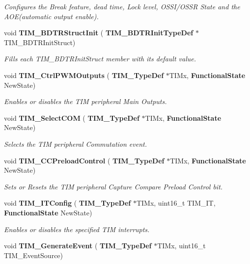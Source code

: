 \begin{DoxyCompactItemize}
\begin{DoxyCompactList}\small\item\em Configures the Break feature, dead time, Lock level, O\+S\+S\+I/\+O\+S\+SR State and the A\+O\+E(automatic output enable). \end{DoxyCompactList}\item 
void \textbf{ T\+I\+M\+\_\+\+B\+D\+T\+R\+Struct\+Init} (\textbf{ T\+I\+M\+\_\+\+B\+D\+T\+R\+Init\+Type\+Def} $\ast$T\+I\+M\+\_\+\+B\+D\+T\+R\+Init\+Struct)
\begin{DoxyCompactList}\small\item\em Fills each T\+I\+M\+\_\+\+B\+D\+T\+R\+Init\+Struct member with its default value. \end{DoxyCompactList}\item 
void \textbf{ T\+I\+M\+\_\+\+Ctrl\+P\+W\+M\+Outputs} (\textbf{ T\+I\+M\+\_\+\+Type\+Def} $\ast$T\+I\+Mx, \textbf{ Functional\+State} New\+State)
\begin{DoxyCompactList}\small\item\em Enables or disables the T\+IM peripheral Main Outputs. \end{DoxyCompactList}\item 
void \textbf{ T\+I\+M\+\_\+\+Select\+C\+OM} (\textbf{ T\+I\+M\+\_\+\+Type\+Def} $\ast$T\+I\+Mx, \textbf{ Functional\+State} New\+State)
\begin{DoxyCompactList}\small\item\em Selects the T\+IM peripheral Commutation event. \end{DoxyCompactList}\item 
void \textbf{ T\+I\+M\+\_\+\+C\+C\+Preload\+Control} (\textbf{ T\+I\+M\+\_\+\+Type\+Def} $\ast$T\+I\+Mx, \textbf{ Functional\+State} New\+State)
\begin{DoxyCompactList}\small\item\em Sets or Resets the T\+IM peripheral Capture Compare Preload Control bit. \end{DoxyCompactList}\item 
void \textbf{ T\+I\+M\+\_\+\+I\+T\+Config} (\textbf{ T\+I\+M\+\_\+\+Type\+Def} $\ast$T\+I\+Mx, uint16\+\_\+t T\+I\+M\+\_\+\+IT, \textbf{ Functional\+State} New\+State)
\begin{DoxyCompactList}\small\item\em Enables or disables the specified T\+IM interrupts. \end{DoxyCompactList}\item 
void \textbf{ T\+I\+M\+\_\+\+Generate\+Event} (\textbf{ T\+I\+M\+\_\+\+Type\+Def} $\ast$T\+I\+Mx, uint16\+\_\+t T\+I\+M\+\_\+\+Event\+Source)

\end{DoxyCompactItemize}
